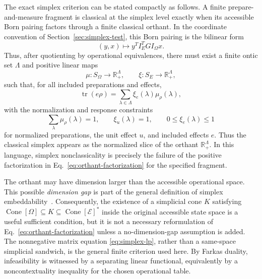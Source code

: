 \documentclass[aps,pra,twocolumn,superscriptaddress,nofootinbib]{revtex4-2}
\newcommand{\E}{\mathcal{E}}
\newcommand{\OmegaSet}{\Omega}
\newcommand{\Cone}{\operatorname{Cone}}
\newcommand{\tr}{\operatorname{tr}}
\newcommand{\reals}{\mathbb{R}}
\begin{document}
The exact simplex criterion can be stated compactly as follows.  A finite
prepare-and-measure fragment is classical at the simplex level exactly when its
accessible Born pairing factors through a finite classical orthant.  In the
coordinate convention of Section~\ref{sec:simplex-test}, this Born pairing is
the bilinear form
\begin{equation}
        (y,x)\longmapsto y^T I_E^T G I_\Omega x.
\end{equation}
Thus, after quotienting by operational equivalences, there must exist a finite
ontic set $\Lambda$ and positive linear maps
\begin{equation}
        \mu:S_\Omega\longrightarrow \reals_+^\Lambda,
        \qquad
        \xi:S_E\longrightarrow \reals_+^\Lambda,
\end{equation}
such that, for all included preparations and effects,
\begin{equation}
        \tr(e\rho)
        =
        \sum_{\lambda\in\Lambda}\xi_e(\lambda)\mu_\rho(\lambda),
        \label{eq:orthant-factorization}
\end{equation}
with the normalization and response constraints
\begin{equation}
  \sum_{\lambda}\mu_\rho(\lambda)=1,
  \qquad \xi_u(\lambda)=1,
  \qquad 0\leq\xi_e(\lambda)\leq1
  \label{eq:orthant-normalization}
\end{equation}
for normalized preparations, the unit effect $u$, and included effects $e$.
Thus the classical simplex appears as the normalized slice of the orthant
$\reals_+^\Lambda$.
In this language, simplex nonclassicality is precisely the failure of the
positive factorization in Eq.~\eqref{eq:orthant-factorization} for the specified
fragment.

The orthant may have dimension larger than the accessible operational space.
This possible \emph{dimension gap} is part of the general definition of simplex
embeddability~\cite{schmid-2021-simplex}.  Consequently, the existence of a
simplicial cone $K$ satisfying
$\Cone[\OmegaSet]\subseteq K\subseteq\Cone[\E]^*$ inside the original
accessible state space is a useful sufficient condition, but it is not a
necessary reformulation of Eq.~\eqref{eq:orthant-factorization} unless a
no-dimension-gap assumption is added.  The nonnegative matrix equation
\eqref{eq:simplex-lp}, rather than a same-space simplicial sandwich, is the
general finite criterion used here.  By Farkas duality, infeasibility is
witnessed by a separating linear functional, equivalently by a
noncontextuality inequality for the chosen operational table.
\end{document}
